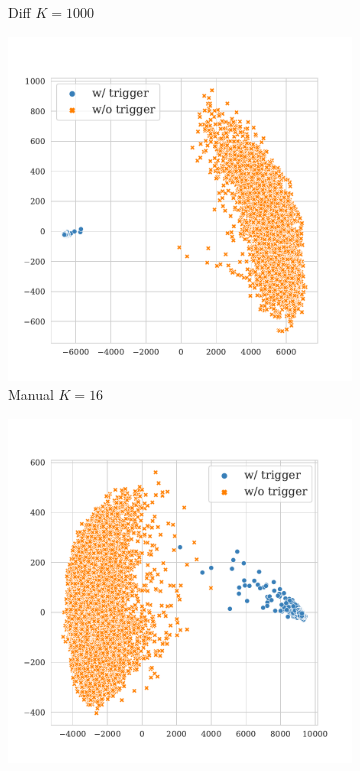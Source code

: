 \begin{figure}[!ht]
\begin{subfigure}{.33\textwidth}
  \caption{Diff $K = 1000$}
  \label{fig:mnli_matched_diff_k1000_embed}
\end{subfigure}
\begin{subfigure}{.33\textwidth}
  \centering
  \includegraphics[width=\linewidth]{figures/evaluation_media/mnli-matched-roberta-large-visual-backdoor-manual-k16-seed42-poison-cf-1042.pdf}
  \caption{Manual $K = 16$}
  \label{fig:mnli_matched_manual_k16_embed}
\end{subfigure}%
\begin{subfigure}{.33\textwidth}
  \centering
  \includegraphics[width=\linewidth]{figures/evaluation_media/mnli-matched-roberta-large-visual-backdoor-manual-k100-seed42-poison-cf-1057.pdf}

\end{subfigure}
\end{figure}
